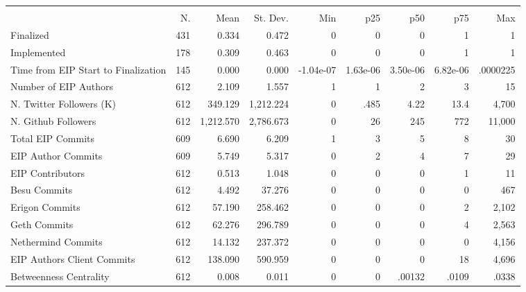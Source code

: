 {
\def\sym#1{\ifmmode^{#1}\else\(^{#1}\)\fi}
\begin{tabular}{l*{1}{rrrrrrrr}}
\hline\hline
                    &\multicolumn{8}{c}{}                                                                                   \\
                    &          N.&        Mean&    St. Dev.&         Min&         p25&         p50&         p75&         Max\\
\hline
Finalized           &         431&       0.334&       0.472&           0&           0&           0&           1&           1\\
Implemented         &         178&       0.309&       0.463&           0&           0&           0&           1&           1\\
Time from EIP Start to Finalization&         145&       0.000&       0.000&   -1.04e-07&    1.63e-06&    3.50e-06&    6.82e-06&    .0000225\\
Number of EIP Authors&         612&       2.109&       1.557&           1&           1&           2&           3&          15\\
N. Twitter Followers (K)&         612&     349.129&   1,212.224&           0&        .485&        4.22&        13.4&       4,700\\
N. Github Followers &         612&   1,212.570&   2,786.673&           0&          26&         245&         772&      11,000\\
Total EIP Commits   &         609&       6.690&       6.209&           1&           3&           5&           8&          30\\
EIP Author Commits  &         609&       5.749&       5.317&           0&           2&           4&           7&          29\\
EIP Contributors    &         612&       0.513&       1.048&           0&           0&           0&           1&          11\\
Besu Commits        &         612&       4.492&      37.276&           0&           0&           0&           0&         467\\
Erigon Commits      &         612&      57.190&     258.462&           0&           0&           0&           2&       2,102\\
Geth Commits        &         612&      62.276&     296.789&           0&           0&           0&           4&       2,563\\
Nethermind Commits  &         612&      14.132&     237.372&           0&           0&           0&           0&       4,156\\
EIP Authors Client Commits&         612&     138.090&     590.959&           0&           0&           0&          18&       4,696\\
Betweenness Centrality&         612&       0.008&       0.011&           0&           0&      .00132&       .0109&       .0338\\
\hline\hline
\end{tabular}
}
